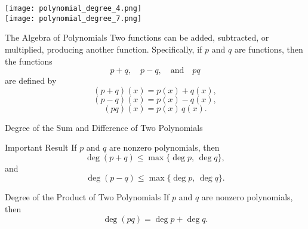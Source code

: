 \begin{frame}
  \centering
  \begin{minipage}[t]{0.45\textwidth}
    \centering
    \texttt{[image: polynomial\_degree\_4.png]}\\[1mm]
    \texttt{[image: polynomial\_degree\_7.png]}
  \end{minipage}
\end{frame}


\begin{frame}{The Algebra of Polynomials}
  Two functions can be added, subtracted, or multiplied, producing another function. Specifically, if \(p\) and \(q\) are functions, then the functions 
  \[
    p+q,\quad p-q,\quad \text{and} \quad pq
  \]
  are defined by
  \[
    (p+q)(x) = p(x) + q(x),
  \]
  \[
    (p-q)(x) = p(x) - q(x),
  \]
  \[
    (pq)(x) = p(x) \, q(x).
  \]
\end{frame}


\begin{frame}{Degree of the Sum and Difference of Two Polynomials}
  \begin{alertblock}{Important Result}
  If \(p\) and \(q\) are nonzero polynomials, then
  \[
  \deg(p+q) \leq \max\{\deg p,\, \deg q\},
  \]
  and
  \[
  \deg(p-q) \leq \max\{\deg p,\, \deg q\}.
  \]
  \end{alertblock}

 
  \begin{alertblock}{Degree of the Product of Two Polynomials}
    If \(p\) and \(q\) are nonzero polynomials, then
    \[
    \deg(pq) = \deg p + \deg q.
    \]
  \end{alertblock}
\end{frame}



